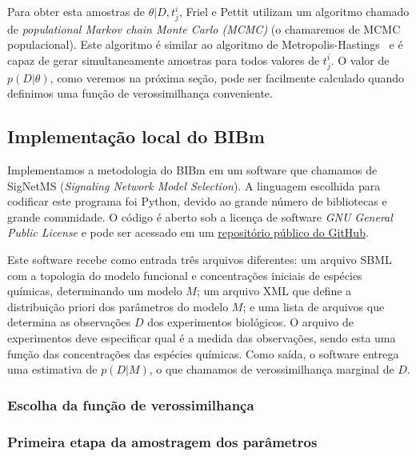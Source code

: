 \documentclass[12pt]{article}
\begin{document}
Para obter esta amostras de $\theta | D, t^i_j$, Friel e Pettit utilizam 
um algoritmo chamado de {\em populational Markov chain Monte Carlo (MCMC)} 
(o chamaremos de MCMC populacional). Este algoritmo é similar ao
algoritmo de Metropolis-Hastings~\cite{BayesianDataAnalysis} e é capaz
de gerar simultaneamente amostras para todos valores de $t^i_j$. O valor
de $p (D | \theta)$, como veremos na próxima seção, pode ser facilmente
calculado quando definimos uma função de verossimilhança conveniente.

\subsection{Implementação local do BIBm}
Implementamos a metodologia do BIBm em um software que chamamos de 
SigNetMS ({\em Signaling Network Model Selection}). A linguagem 
escolhida para codificar este programa foi Python, devido ao grande 
número de bibliotecas e grande comunidade. O código é aberto sob a 
licença de software {\em GNU General Public License} e pode ser acessado 
em um \href{https://github.com/gustavoem/SigNetMS}{repositório público 
do GitHub}.

Este software recebe como entrada três arquivos diferentes: um arquivo 
SBML com a topologia do modelo funcional e concentrações iniciais de 
espécies químicas, determinando um modelo $M$; um arquivo XML que
define a distribuição priori dos parâmetros do modelo $M$; e uma lista 
de arquivos que determina as observações $D$ dos experimentos 
biológicos. O arquivo de experimentos deve especificar qual é a medida 
das observações, sendo esta uma função das concentrações das espécies 
químicas. Como saída, o software entrega uma estimativa de $p (D | M)$,
o que chamamos de verossimilhança marginal de $D$.

\subsubsection{Escolha da função de verossimilhança}

\subsubsection{Primeira etapa da amostragem dos parâmetros}
\end{document}
